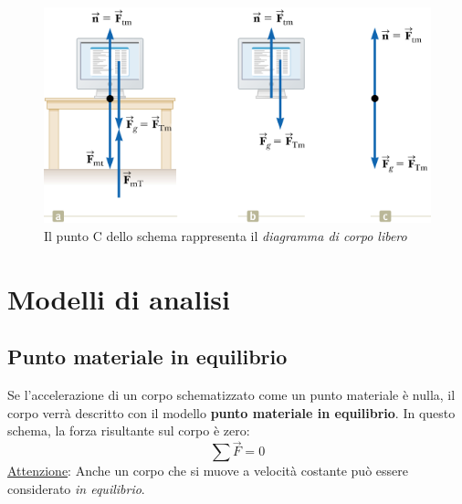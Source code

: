 \documentclass[12pt,oneside]{book}
\begin{document}
\begin{figure}[h]
    \centering
    \includegraphics[scale=0.4]{diagramma_corpo_libero}
    \caption*{\small Il punto C dello schema rappresenta il \emph{diagramma di corpo libero}}
\end{figure}

\section{Modelli di analisi}
\subsection{Punto materiale in equilibrio}
Se l’accelerazione di un corpo schematizzato come un punto materiale è nulla, il corpo verrà descritto con il modello \textbf{punto materiale in equilibrio}.
In questo schema, la forza risultante sul corpo è zero:
\begin{equation*}
    \sum \vec{F} = 0
\end{equation*}
\underline{Attenzione}: Anche un corpo che si muove a velocità costante può essere considerato \emph{in equilibrio}.
\end{document}
